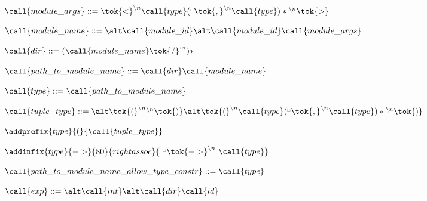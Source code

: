  
   \item $\call{module\_args} ::=
   \tok{<}^{\backslash{}n} \call{type} ({}^\textrm\textvisiblespace\tok{,}^{\backslash{}n} \call{type})* {}^{\backslash{}n}\tok{>}$
   
 
   \item $\call{module\_name} ::= \\
   \alt \call{module\_id} \\
   \alt \call{module\_id}\call{module\_args}$
    
 
   \item $\call{dir} ::= (\call{module\_name} \tok{/}^\nleftrightarrow)*$
   \item $\call{path\_to\_module\_name} ::=  \call{dir}\call{module\_name}$
   

  \item $\call{type} ::= \call{path\_to\_module\_name}$
   
 
   \item $\call{tuple\_type} ::= \\
    \alt \tok{(}^{\backslash{}n}{}^{\backslash{}n}\tok{)}\\
    \alt \tok{(}^{\backslash{}n} \call{type} ({}^\textrm\textvisiblespace\tok{,}^{\backslash{}n} \call{type})* {}^{\backslash{}n}\tok{)}$
   \item $\addprefix{type}{(}{\call{tuple\_type}}$
    

  \item $\addinfix{type}{->}{80}{rightassoc}{
  \ {}^\textrm\textvisiblespace\tok{->}^{\backslash{}n}\ \call{type}}$


  \item $\call{path\_to\_module\_name\_allow\_type\_constr} ::= \call{type}$
  

  \item $\call{exp} ::=\\
  \alt \call{int}\\
  \alt \call{dir}\call{id}$
   

